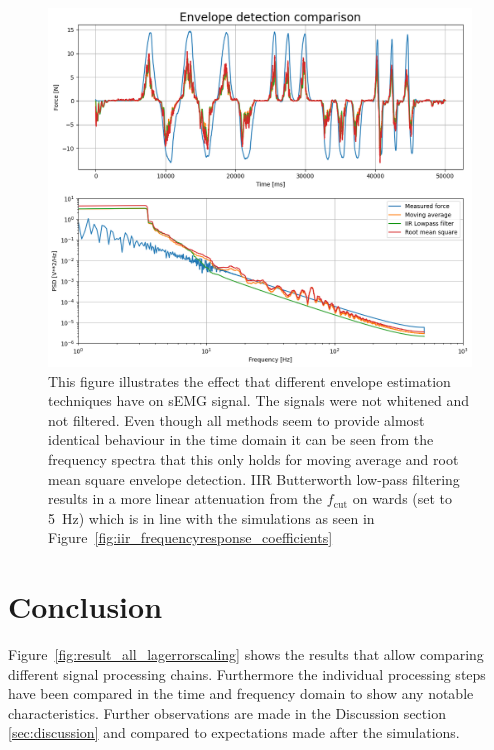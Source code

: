 \begin{figure}[h!t]
	\begin{center}
		\includegraphics[width=1.0\columnwidth]{images/measurement_envelopes.png}
	\end{center}
	\caption{This figure illustrates the effect that different envelope estimation techniques have on sEMG signal. The signals were not whitened and not filtered. Even though all methods seem to provide almost identical behaviour in the time domain it can be seen from the frequency spectra that this only holds for moving average and root mean square envelope detection. IIR Butterworth low-pass filtering results in a more linear attenuation from the $f_\text{cut}$ on wards (set to \SI{5}{\hertz}) which is in line with the simulations as seen in Figure~\ref{fig:iir_frequencyresponse_coefficients}}
	\label{fig:result_envelopes}
\end{figure}

\section{Conclusion}
Figure~\ref{fig:result_all_lagerrorscaling} shows the results that allow comparing different signal processing chains. Furthermore the individual processing steps have been compared in the time and frequency domain to show any notable characteristics. Further observations are made in the Discussion section \ref{sec:discussion} and compared to expectations made after the simulations.